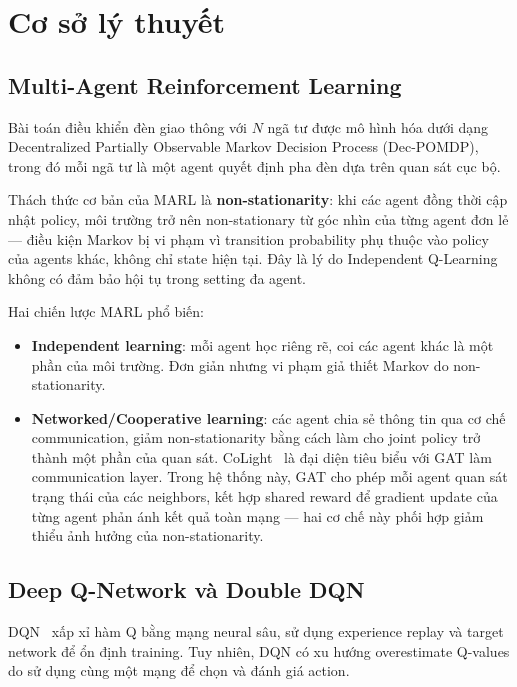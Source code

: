 \documentclass[conference]{IEEEtran}
\begin{document}
\section{Cơ sở lý thuyết}

\subsection{Multi-Agent Reinforcement Learning}

Bài toán điều khiển đèn giao thông với $N$ ngã tư được mô hình hóa dưới dạng Decentralized Partially Observable Markov Decision Process (Dec-POMDP), trong đó mỗi ngã tư là một agent quyết định pha đèn dựa trên quan sát cục bộ.

Thách thức cơ bản của MARL là \textbf{non-stationarity}: khi các agent đồng thời cập nhật policy, môi trường trở nên non-stationary từ góc nhìn của từng agent đơn lẻ --- điều kiện Markov bị vi phạm vì transition probability phụ thuộc vào policy của agents khác, không chỉ state hiện tại. Đây là lý do Independent Q-Learning không có đảm bảo hội tụ trong setting đa agent.

Hai chiến lược MARL phổ biến:
\begin{itemize}[leftmargin=*]
    \item \textbf{Independent learning}: mỗi agent học riêng rẽ, coi các agent khác là một phần của môi trường. Đơn giản nhưng vi phạm giả thiết Markov do non-stationarity.
    \item \textbf{Networked/Cooperative learning}: các agent chia sẻ thông tin qua cơ chế communication, giảm non-stationarity bằng cách làm cho joint policy trở thành một phần của quan sát. CoLight~\cite{CoLight2019} là đại diện tiêu biểu với GAT làm communication layer. Trong hệ thống này, GAT cho phép mỗi agent quan sát trạng thái của các neighbors, kết hợp shared reward để gradient update của từng agent phản ánh kết quả toàn mạng --- hai cơ chế này phối hợp giảm thiểu ảnh hưởng của non-stationarity.
\end{itemize}

\subsection{Deep Q-Network và Double DQN}

DQN~\cite{Mnih2015} xấp xỉ hàm Q bằng mạng neural sâu, sử dụng experience replay và target network để ổn định training. Tuy nhiên, DQN có xu hướng overestimate Q-values do sử dụng cùng một mạng để chọn và đánh giá action.
\end{document}
